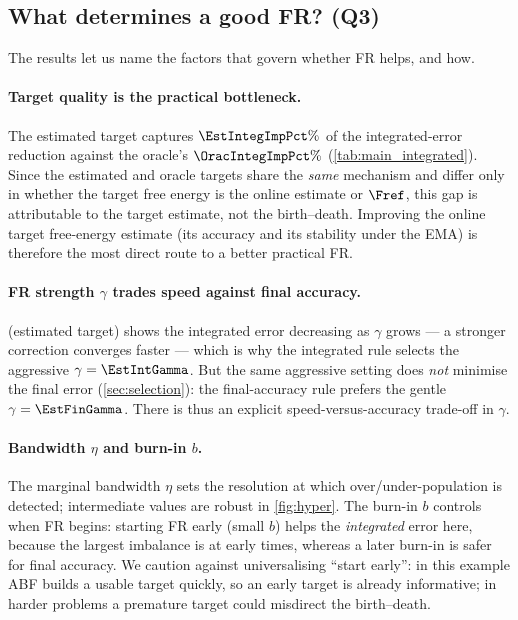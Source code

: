 \subsection{What determines a good FR? (Q3)}
\label{sec:q3}
The results let us name the factors that govern whether FR helps, and how.

\paragraph{Target quality is the practical bottleneck.}
The estimated target captures $\EstIntegImpPct\%$ of the integrated-error
reduction against the oracle's $\OracIntegImpPct\%$ (\cref{tab:main_integrated}).
Since the estimated and oracle targets share the \emph{same} mechanism and
differ only in whether the target free energy is the online estimate or
$\Fref$, this gap is attributable to the target estimate, not the birth--death.
Improving the online target free-energy estimate (its accuracy and its
stability under the EMA) is therefore the most direct route to a better
practical FR.

\paragraph{FR strength $\gamma$ trades speed against final accuracy.}
 (estimated target) shows the integrated error decreasing as
$\gamma$ grows --- a stronger correction converges faster --- which is why the
integrated rule selects the aggressive $\gamma=\EstIntGamma$. But the same
aggressive setting does \emph{not} minimise the final error (\cref{sec:selection}):
the final-accuracy rule prefers the gentle $\gamma=\EstFinGamma$. There is thus
an explicit speed-versus-accuracy trade-off in $\gamma$.

\paragraph{Bandwidth $\eta$ and burn-in $b$.}
The marginal bandwidth $\eta$ sets the resolution at which over/under-population
is detected; intermediate values are robust in \cref{fig:hyper}. The burn-in $b$
controls when FR begins: starting FR early (small $b$) helps the
\emph{integrated} error here, because the largest imbalance is at early times,
whereas a later burn-in is safer for final accuracy. We caution against
universalising ``start early'': in this example ABF builds a usable target
quickly, so an early target is already informative; in harder problems a premature
target could misdirect the birth--death.

